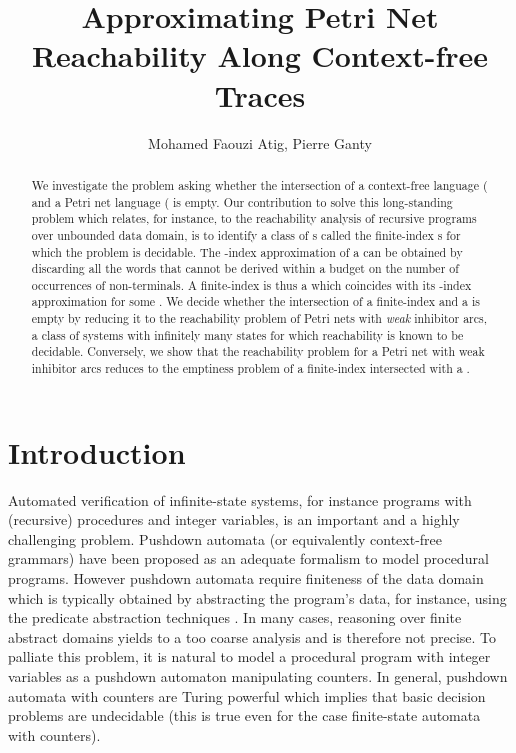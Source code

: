 \documentclass{fsttcs}
\begin{document}
\title{Approximating Petri Net Reachability Along Context-free Traces}

\author{Mohamed Faouzi Atig, Pierre Ganty}






\begin{abstract}
We investigate the problem asking whether the intersection of a
context-free language ( and a Petri net language ( is empty.
Our contribution to solve this long-standing problem which relates, for
instance, to the reachability analysis of recursive programs over unbounded
data domain, is to identify a class of s called the finite-index
s for which the problem is decidable.  The -index approximation of
a   can be obtained by discarding all the words that cannot be derived
within a budget  on the number of occurrences of non-terminals.  A
finite-index  is thus a  which coincides with its -index
approximation for some . We decide whether the intersection of a finite-index  and a  is empty by reducing it to the reachability
problem of Petri nets with {\em weak} inhibitor arcs, a class of
systems with infinitely many states for which reachability is known to be
decidable.  Conversely, we show that the reachability problem for a Petri net
with weak inhibitor arcs reduces to the emptiness problem of a finite-index
 intersected with a .
\end{abstract}

\section{Introduction}



Automated verification of infinite-state systems, for instance programs with
(recursive) procedures and integer variables, is an important and a highly
challenging problem.  Pushdown automata (or equivalently context-free grammars) have been
proposed as an adequate formalism to model procedural programs. However
pushdown automata require finiteness of the data domain which is typically
obtained by abstracting the program's data, for instance, using the predicate
abstraction techniques \cite{Cousot77-POPL,GS97}.  In many cases, reasoning
over finite abstract domains yields to a too coarse analysis and is therefore
not precise. To palliate this problem, it is natural to model a procedural
program with integer variables as a pushdown automaton manipulating counters.
In general, pushdown automata with counters are Turing powerful 
which implies that basic decision problems are undecidable (this is true even
for the case finite-state automata with counters).  
\end{document}
